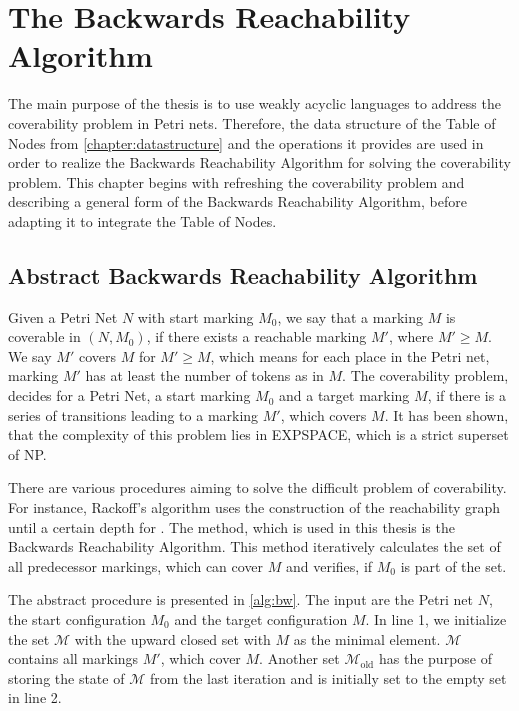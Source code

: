 \chapter{The Backwards Reachability Algorithm}\label{chapter:coverability}

The main purpose of the thesis is to use weakly acyclic languages to address the coverability problem in Petri nets. Therefore, the data structure of the Table of Nodes from \autoref{chapter:datastructure} and the operations it provides are used in order to realize the Backwards Reachability Algorithm for solving the coverability problem. This chapter begins with refreshing the coverability problem and describing a general form of the Backwards Reachability Algorithm, before adapting it to integrate the  Table of Nodes.

\section{Abstract Backwards Reachability Algorithm}\label{sec:abstractbw} 
Given a Petri Net $N$ with start marking $M_{0}$, we say that a marking $M$ is coverable in $(N,M_{0})$, if there exists a reachable marking $M'$, where $M'\ge M$. We say $M'$ covers $M$ for $M'\ge M$, which means for each place in the Petri net, marking $M'$ has at least the number of tokens as in $M$.
The coverability problem, decides for a Petri Net, a start marking $M_{0}$ and a target marking $M$, if there is a series of transitions leading to a marking $M'$, which covers $M$. It has been shown, that the complexity of this problem lies in EXPSPACE, which is a strict superset of NP. 
\par
There are various procedures aiming to solve the difficult problem of coverability. For instance, Rackoff's algorithm uses the construction of the reachability graph until a certain depth for . 
The method, which is used in this thesis is the Backwards Reachability Algorithm. This method iteratively calculates the set of all predecessor markings, which can cover $M$ and verifies, if $M_{0}$ is part of the set.
\par 
The abstract procedure is presented in \autoref{alg:bw}. The input are the Petri net $N$, the start configuration $M_{0}$ and the target configuration $M$. In line 1, we initialize the set $\mathcal{M}$ with the upward closed set with $M$ as the minimal element. $\mathcal{M}$ contains all markings $M'$, which cover $M$. Another set $\mathcal{M}_{\text{old}}$ has the purpose of storing the state of $\mathcal{M}$ from the last iteration and is initially set to the empty set in line 2.


